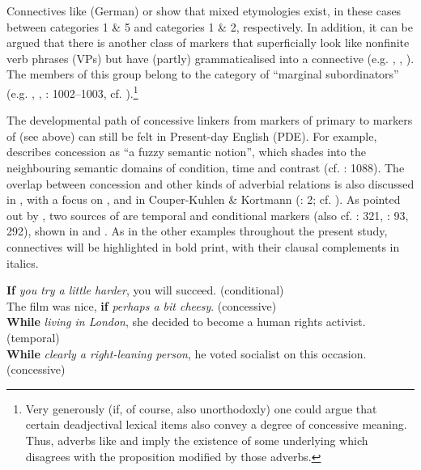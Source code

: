 Connectives like  (German) or  show that mixed etymologies exist, in these cases between categories 1 \& 5 and categories 1 \& 2, respectively. In addition, it can be argued that there is another class of markers that superficially look like nonfinite verb phrases (VPs) but have (partly) grammaticalised into a connective (e.g. , , ). The members of this group belong to the category of “marginal subordinators” (e.g. , , \citealt{QuirkEtAl1985}: 1002–1003, cf. \citealt{Schützler2018a}).\footnote{Very generously (if, of course, also unorthodoxly) one could argue that certain deadjectival lexical items also convey a degree of concessive meaning. Thus, adverbs like  and  imply the existence of some underlying  which disagrees with the proposition modified by those adverbs.}

The developmental path of concessive linkers from markers of primary to markers of  (see above) can still be felt in Present-day English (PDE). For example, \citet[40]{Aarts1988} describes concession as “a fuzzy semantic notion”, which shades into the neighbouring semantic domains of condition, time and contrast (cf. \citealt{QuirkEtAl1985}: 1088). The overlap between concession and other kinds of adverbial relations is also discussed in \citet[66]{Burnham1911}, with a focus on , and in Couper-Kuhlen \& Kortmann (\citeyear{Couper-KuhlenKortmann2000Introduction}: 2; cf. \citealt{KönigSiemund2000,Harris1988}). As pointed out by \citet[168]{Hilpert2013a}, two sources of  are temporal and conditional markers (also cf. \citealt{Kortmann1996}: 321, \citealt{HeineKuteva2002}: 93, 292), shown in  and . As in the other examples throughout the present study, connectives will be highlighted in bold print, with their clausal complements in italics.

\ea\label{ex:1}
    \ea\label{bkm:Ref118500031}\textbf{If} \textit{you try a little harder}, you will succeed. (conditional)\\
    \ex\label{ex:1b}The film was nice, \textbf{if} \textit{perhaps a bit cheesy}. (concessive)\\
  \z
\ex\label{ex:2}
    \ea\label{bkm:Ref118500042}  \textbf{While} \textit{living in London}, she decided to become a human rights activist. (temporal)\\
    \ex\label{ex:2b}\textbf{While} \textit{clearly a right-leaning person}, he voted socialist on this occasion. (concessive)\\
  \z
\z

